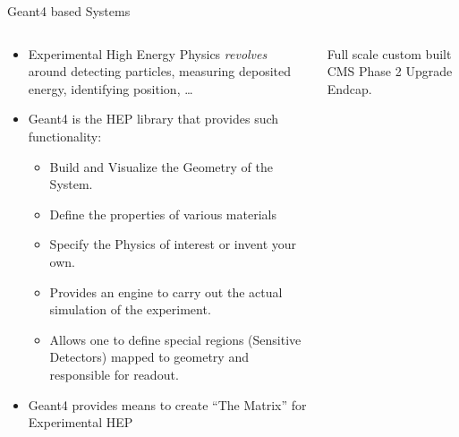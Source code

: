 \documentclass[pdf, 9pt]{beamer}
\begin{document}
  \begin{frame}{Geant4 based Systems}
    \begin{columns}[T]
      \begin{column}{0.7\textwidth}
        \begin{flushright}
          \begin{itemize}
            \item Experimental High Energy Physics \textit{revolves} around detecting particles, measuring deposited energy, identifying position, \dots
            \item Geant4 is the HEP library that provides such functionality:
              \begin{itemize}
                \item Build and Visualize the Geometry of the System.
                \item Define the properties of various materials
                \item Specify the Physics of interest or invent your own.
                \item Provides an engine to carry out the actual simulation of the experiment.
                \item Allows one to define special regions (Sensitive Detectors) mapped to geometry and responsible for readout.
              \end{itemize}
            \item \alert{Geant4 provides means to create ``The Matrix'' for Experimental HEP}
          \end{itemize}
        \end{flushright}
      \end{column}
      \begin{column}{0.3\textwidth}
        \begin{flushright}
          \begin{small} Full scale custom built CMS Phase 2 Upgrade Endcap.\end{small}\\ \vspace{0.3cm}

\end{flushright}
\end{column}
\end{columns}
\end{frame}
\end{document}
